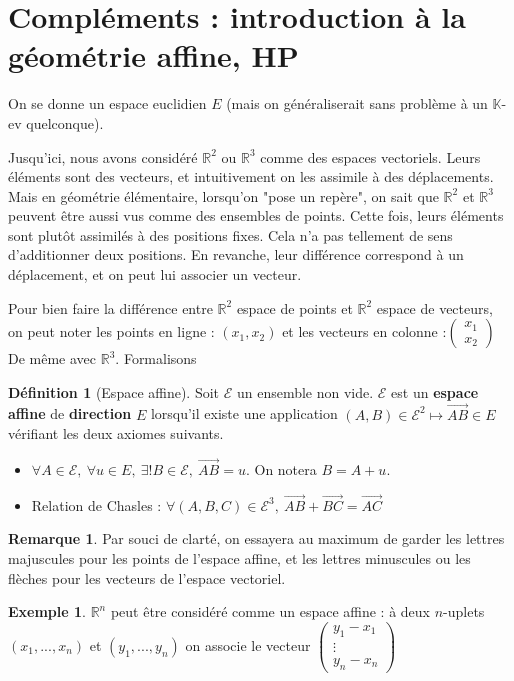 \documentclass[french]{book}
\newcommand{\K}{\mathbb{K}}
\theoremstyle{plain}
\theoremstyle{definition}
\newtheorem{dfn}{Définition}[chapter]
\newtheorem{exa}{Exemple}[chapter]
\newtheorem{rmq}{Remarque}[chapter]
\theoremstyle{remark}
\begin{document}
\section{Compléments : introduction à la géométrie affine, HP}
On se donne un espace euclidien $E$ (mais on généraliserait sans problème à un $\K$-ev quelconque).
\\ \par 
Jusqu'ici, nous avons considéré $\mathbb{R}^2$ ou $\mathbb{R}^3$ comme des espaces vectoriels. Leurs éléments sont des vecteurs, et intuitivement on les assimile à des déplacements. Mais en géométrie élémentaire, lorsqu'on "pose un repère", on sait que $\mathbb{R}^2$ et $\mathbb{R}^3$ peuvent être aussi vus comme des ensembles de points. Cette fois, leurs éléments sont plutôt assimilés à des positions fixes. Cela n'a pas tellement de sens d'additionner deux positions. En revanche, leur différence correspond à un déplacement, et on peut lui associer un vecteur.
\\ \par
Pour bien faire la différence entre $\mathbb{R}^2$ espace de points et $\mathbb{R}^2$ espace de vecteurs, on peut noter les points en ligne : $(x_1, x_2)$ et les vecteurs en colonne :$\displaystyle\begin{pmatrix}
	x_1 \\
	x_2
\end{pmatrix}$
De même avec $\mathbb{R}^3$. Formalisons
\begin{dfn}[Espace affine]
	Soit $\mathcal{E}$ un ensemble non vide. $\mathcal{E}$ est un \textbf{espace affine} de \textbf{direction} $E$ lorsqu'il existe une application $(A,B) \in \mathcal{E}^2 \mapsto \overrightarrow{AB} \in E$ vérifiant les deux axiomes suivants.
\begin{itemize}
	\item $\forall A \in \mathcal{E},\ \forall u \in E,\ \exists! B \in \mathcal{E},\ \overrightarrow{AB} = u.$ On notera $B = A + u.$
	\item Relation de Chasles : $\forall(A,B,C) \in \mathcal{E}^3,\ \overrightarrow{AB} + \overrightarrow{BC} = \overrightarrow{AC}$
\end{itemize}
\end{dfn}
\begin{rmq}
	Par souci de clarté, on essayera au maximum de garder les lettres majuscules pour les points de l'espace affine, et les lettres minuscules ou les flèches pour les vecteurs de l'espace vectoriel.
\end{rmq}
\begin{exa}
	$\mathbb{R}^n$ peut être considéré comme un espace affine : à deux $n$-uplets $(x_1, ..., x_n)$ et $(y_1, ..., y_n)$ on associe le vecteur $\displaystyle\begin{pmatrix}
	y_1 - x_1 \\
	\vdots \\
	y_n - x_n
\end{pmatrix}$
\end{exa}
\end{document}
